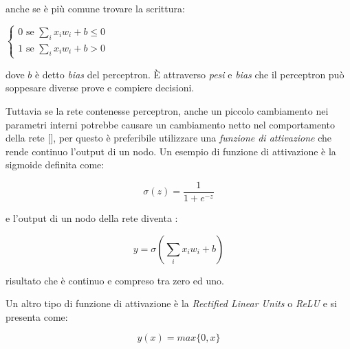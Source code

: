 \documentclass[12pt,a4paper]{report}
\begin{document}
anche se è più comune trovare la scrittura:

\begin{center}
$\begin{cases}
 0 \text{ se } \sum_{i} x_{i}w_{i} + b \leq 0\\
 1 \text{ se } \sum_{i} x_{i}w_{i} + b > 0
\end{cases}$
\end{center}

dove $b$ è detto \textit{bias} del perceptron.
È attraverso \textit{pesi} e \textit{bias} che il perceptron può soppesare diverse prove e compiere decisioni.

Tuttavia se la rete contenesse perceptron, anche un piccolo cambiamento nei parametri interni potrebbe causare un cambiamento netto nel comportamento della rete [\cite{neural-net-nielsen}], per questo è preferibile utilizzare una \textit{funzione di attivazione} che rende continuo l'output di un nodo.
Un esempio di funzione di attivazione è la sigmoide definita come:

\begin{equation} \label{sigma}
 \sigma(z) = \frac{1}{1+e^{-z}} 
\end{equation}

e l'output di un nodo della rete diventa :

\begin{equation} \label{z}
  y = \sigma(\sum_{i}{x_{i}w_{i}} + b)
\end{equation}

risultato che è continuo e compreso tra zero ed uno.

Un altro tipo di funzione di attivazione è la \textit{Rectified Linear Units} o \textit{ReLU} e si presenta come:

\begin{equation}
 y(x) = max \{0,x\} 
\end{equation}
\end{document}
